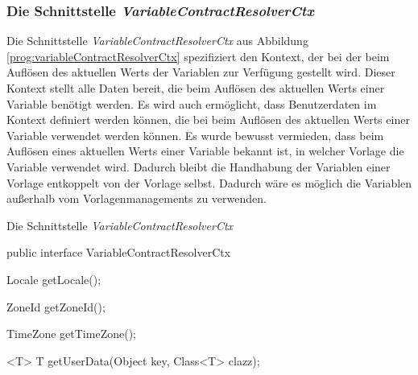 \subsubsection{Die Schnittstelle \emph{VariableContractResolverCtx}}
\label{sec:variableResolverFactoryProvider}
Die Schnittstelle \emph{VariableContractResolverCtx} aus Abbildung \ref{prog:variableContractResolverCtx} spezifiziert den Kontext, der bei der beim Auflösen des aktuellen Werts der Variablen zur Verfügung gestellt wird. Dieser Kontext stellt alle Daten bereit, die beim Auflösen des aktuellen Werts einer Variable benötigt werden. Es wird auch ermöglicht, dass Benutzerdaten im Kontext definiert werden können, die bei beim Auflösen des aktuellen Werts einer Variable verwendet werden können. Es wurde bewusst vermieden, dass beim Auflösen eines aktuellen Werts einer Variable bekannt ist, in welcher Vorlage die Variable verwendet wird. Dadurch bleibt die Handhabung der Variablen einer Vorlage entkoppelt von der Vorlage selbst. Dadurch wäre es möglich die Variablen außerhalb vom Vorlagenmanagements zu verwenden.
\newpage

\begin{program}[h]
\caption{Die Schnittstelle \emph{VariableContractResolverCtx}}
\label{prog:variableContractResolverCtx}
\begin{JavaCode}
public interface VariableContractResolverCtx {

    Locale getLocale();

    ZoneId getZoneId();

    TimeZone getTimeZone();

    <T> T getUserData(Object key,
                      Class<T> clazz);
}
\end{JavaCode}
\end{program}

